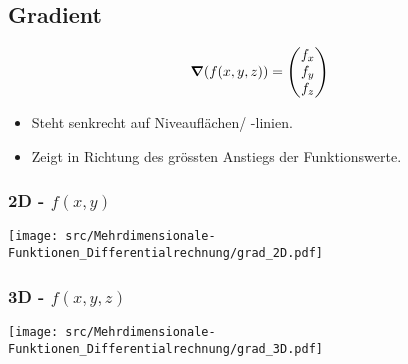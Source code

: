 \subsection{Gradient}
    \vspace{-0.75em}
    $$
        \grad(f(x,y,z)) = \begin{pmatrix}
            f_x \\ f_y \\ f_z
        \end{pmatrix}
    $$
    \begin{itemize}
        \item Steht senkrecht auf Niveauflächen/ -linien.
        \item Zeigt in Richtung des grössten Anstiegs der Funktionswerte.
    \end{itemize}
    \subsubsection{2D - \texorpdfstring{$f(x,y)$}{f(x,y)}}
        \texttt{[image: src/Mehrdimensionale-Funktionen\_Differentialrechnung/grad\_2D.pdf]}
    \subsubsection{3D - \texorpdfstring{$f(x,y,z)$}{f(x,y,z)}}
        \begin{center}
            \texttt{[image: src/Mehrdimensionale-Funktionen\_Differentialrechnung/grad\_3D.pdf]}
        \end{center}